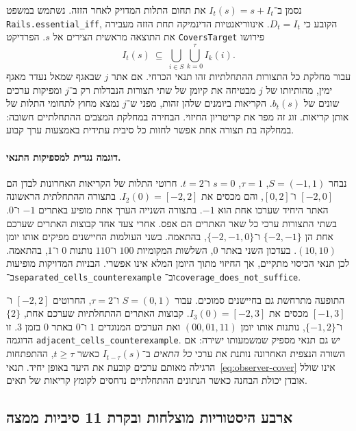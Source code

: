\documentclass[11pt,a4paper]{article}
\DeclareRobustCommand{\textenglish}[1]{\foreignlanguage{english}{#1}}
\theoremstyle{definition}
\begin{document}
נסמן ב־$I_t(s)=s+I_t$ את תחום התלות המדויק לאחר הזזה. נשתמש במשפט \textenglish{\texttt{Rails.essential\_iff}}, הקובע כי $D_t=I_t$. אינווריאנטיות הדינמיקה תחת הזזה מעבירה את התוצאה מראשית הצירים אל $s$. הפרדיקט \textenglish{\texttt{CoversTarget}} פירושו
\begin{equation}
 I_t(s)\ \subseteq\ \bigcup_{i\in S}\bigcup_{k=0}^{\tau} I_k(i).
 \label{eq:observer-cover}
\end{equation}
עבור מחלקת כל התצורות ההתחלתיות זהו תנאי הכרחי. אם אתר $j$ שבאגף שמאל נעדר מאגף ימין, מהותיותו של $j$ מבטיחה את קיומן של שתי תצורות הנבדלות רק ב־$j$ ומפיקות ערכים שונים של $b_t(s)$. הקריאות ביומנים שלהן זהות, מפני ש־$j$ נמצא מחוץ לתחומי התלות של אותן קריאות. זוג זה מפר את קריטריון החיזוי. הבחירה במחלקת המצבים ההתחלתיים חשובה: במחלקה בת תצורה אחת אפשר לחזות כל סיבית עתידית באמצעות ערך קבוע.

\paragraph{דוגמה נגדית למספיקות התנאי.}
נבחר $S=(-1,1)$, $\tau=1$, $s=0$ ו־$t=2$. חרוטי התלות של הקריאות האחרונות לבדן הם $[-2,0]$ ו־$[0,2]$, והם מכסים את $I_2(0)=[-2,2]$. בתצורה ההתחלתית הראשונה האתר היחיד שערכו אחת הוא $-1$. בתצורה השנייה הערך אחת מופיע באתרים $-1$ ו־$0$. בשתי התצורות ערכי כל שאר האתרים הם אפס. אחרי צעד אחד קבוצות האתרים שערכם אחת הן $\{-2,-1\}$ ו־$\{-2,-1,0\}$, בהתאמה. בשני העולמות החיישנים מפיקים אותו יומן $(10,10)$. בעדכון השני באתר $0$, השלשות המקומיות $100$ ו־$110$ נותנות $0$ ו־$1$, בהתאמה. לכן תנאי הכיסוי מתקיים, אך החיזוי מתוך היומן המלא אינו אפשרי. הבניות המדויקות מופיעות ב־\textenglish{\texttt{separated\_cells\_counterexample}} וב־\textenglish{\texttt{coverage\_does\_not\_suffice}}.

התופעה מתרחשת גם בחיישנים סמוכים. עבור $S=(0,1)$ ו־$\tau=2$, החרוטים $[-2,2]$ ו־$[-1,3]$ מכסים את $I_3(0)=[-2,3]$. קבוצות האתרים ההתחלתיות שערכם אחת, $\{2\}$ ו־$\{-1,2\}$, נותנות אותו יומן $(00,01,11)$ ואת הערכים המנוגדים $1$ ו־$0$ באתר $0$ בזמן $3$. זו הדוגמה \textenglish{\texttt{adjacent\_cells\_counterexample}}. יש גם תנאי מספיק שמשמעותו ישירה: אם השורה הנצפית האחרונה נותנת את ערכי \emph{כל התאים} ב־$I_{t-\tau}(s)$ כאשר $t\ge\tau$, ההתפתחות הרגילה מאותם ערכים קובעת את היעד באופן יחיד. תנאי~\eqref{eq:observer-cover} אינו שולל אובדן יכולת הבחנה כאשר הנתונים ההתחלתיים נדחסים לקומץ קריאות של תאים.

\subsection{ארבע היסטוריות מוצלחות ובקרת 11 סיביות ממצה}
\end{document}
